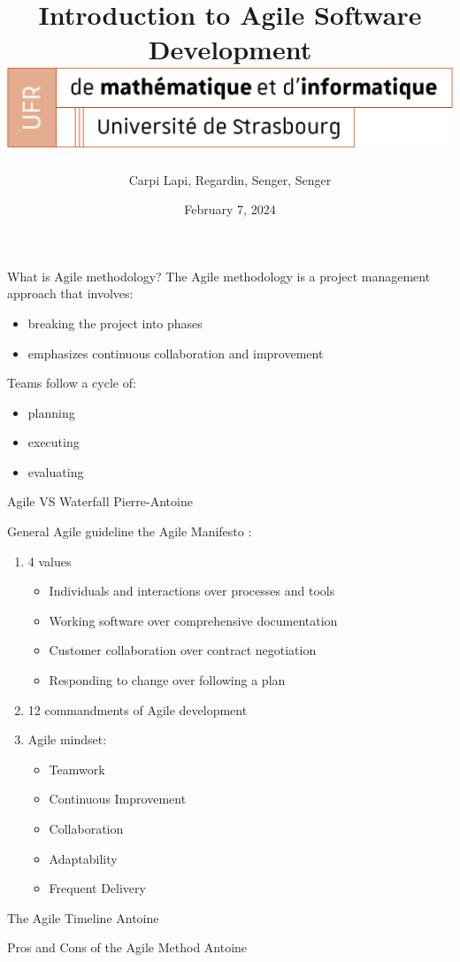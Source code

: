 \documentclass[10pt]{beamer}
\title[Introduction to Agile Software Development]{
  Introduction to Agile Software Development \\
  \vspace{1cm}
  \includegraphics[width=0.6\pdfpagewidth]{logo_Uni.png}
}
\author[SuperAgile]{Carpi Lapi, Regardin, Senger, Senger}
\date[February 7, 2024]{February 7, 2024}
\begin{document}
\frame{\titlepage}

\begin{frame}{What is Agile methodology?}
The Agile methodology is a project management approach that involves:
\begin{itemize}
    \item breaking the project into phases
    \item emphasizes continuous collaboration and improvement \\
    \vspace{1cm}
\end{itemize}

Teams follow a cycle of: 
\begin{itemize}
    \item planning
    \item executing
    \item evaluating
\end{itemize}

\end{frame}

\begin{frame}{Agile VS Waterfall}
    Pierre-Antoine
\end{frame}

\begin{frame}{General Agile guideline}
    the Agile Manifesto : \\
    \begin{enumerate}
    \item 4 values
    \begin{itemize}
      \item Individuals and interactions over processes and tools 
      \item Working software over comprehensive documentation
      \item Customer collaboration over contract negotiation 
      \item Responding to change over following a plan
    \end{itemize}
    \item 12 commandments of Agile development \\
    \item Agile mindset: 
    \begin{itemize}
      \item Teamwork
      \item Continuous Improvement
      \item Collaboration
      \item Adaptability
      \item Frequent Delivery
    \end{itemize}
    \end{enumerate}

\end{frame}

\begin{frame}{The Agile Timeline}
    Antoine
\end{frame}

\begin{frame}{Pros and Cons of the Agile Method}
    Antoine
\end{frame}

\begin{frame}
  
\end{frame}
\end{document}
